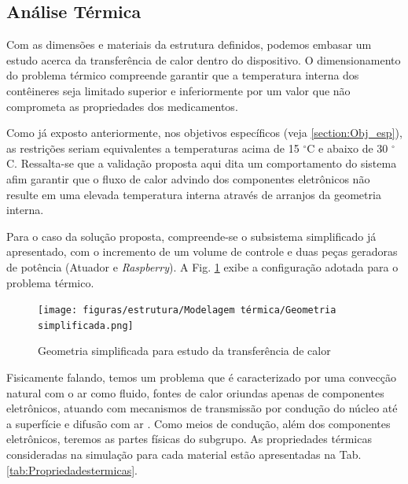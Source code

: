 \subsection{Análise Térmica} \label{section:AnaliseTermica}


Com as dimensões e materiais da estrutura definidos, podemos embasar um estudo acerca da transferência de calor dentro do dispositivo. O dimensionamento do problema térmico compreende garantir que a temperatura interna dos contêineres seja limitado superior e inferiormente por um valor que não comprometa as propriedades dos medicamentos. 

Como já exposto anteriormente, nos objetivos específicos (veja \ref{section:Obj_esp}), as restrições seriam equivalentes a temperaturas acima de 15 $^{\circ}$C e abaixo de 30 $^{\circ}$C. Ressalta-se que a validação proposta aqui dita um comportamento do sistema afim garantir que o fluxo de calor advindo dos componentes eletrônicos não resulte em uma elevada temperatura interna através de arranjos da geometria interna.

  

Para o caso da solução proposta, compreende-se o subsistema simplificado já apresentado, com o incremento de um volume de controle e duas peças geradoras de potência (Atuador e \textit{Raspberry}). A Fig. \ref{fig:subgrupo_termico} exibe a configuração adotada para o problema térmico.

\begin{figure}[ht]
        \centering
        \texttt{[image: figuras/estrutura/Modelagem térmica/Geometria simplificada.png]}
        \caption{Geometria simplificada para estudo da transferência de calor}
        \label{fig:subgrupo_termico}
    \end{figure}

Fisicamente falando, temos um problema que é caracterizado por uma convecção natural com o ar como fluido, fontes de calor oriundas apenas de componentes eletrônicos, atuando com mecanismos de transmissão por condução do núcleo até a superfície e difusão com ar \cite{transcal}. Como meios de condução, além dos componentes eletrônicos, teremos as partes físicas do subgrupo. As propriedades térmicas consideradas na simulação para cada material estão apresentadas na Tab. \ref{tab:Propriedadestermicas}.

